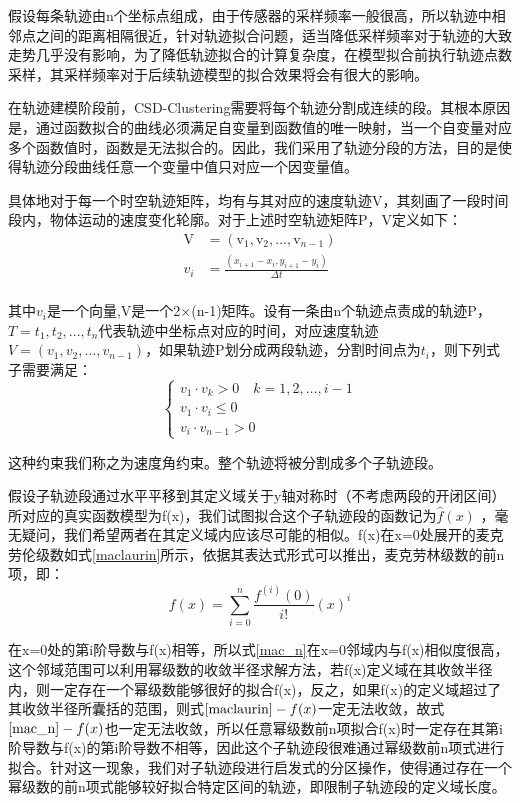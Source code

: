 假设每条轨迹由n个坐标点组成，由于传感器的采样频率一般很高，所以轨迹中相邻点之间的距离相隔很近，针对轨迹拟合问题，适当降低采样频率对于轨迹的大致走势几乎没有影响，为了降低轨迹拟合的计算复杂度，在模型拟合前执行轨迹点数采样，其采样频率对于后续轨迹模型的拟合效果将会有很大的影响。

在轨迹建模阶段前，CSD-Clustering需要将每个轨迹分割成连续的段。其根本原因是，通过函数拟合的曲线必须满足自变量到函数值的唯一映射，当一个自变量对应多个函数值时，函数是无法拟合的。因此，我们采用了轨迹分段的方法，目的是使得轨迹分段曲线任意一个变量中值只对应一个因变量值。

具体地对于每一个时空轨迹矩阵，均有与其对应的速度轨迹V，其刻画了一段时间段内，物体运动的速度变化轮廓。对于上述时空轨迹矩阵P，V定义如下：
\[\begin{aligned}
	\text{V}&=\left( \text{v}_1,\text{v}_2,...,\text{v}_{n-1} \right)\\
	v_i&=\frac{\left( x_{i+1}-x_i,y_{i+1}-y_i \right)}{\varDelta t}\\
\end{aligned}\]

其中$v_i$是一个向量,V是一个2×(n-1)矩阵。设有一条由n个轨迹点责成的轨迹P，$T={t_1,t_2,...,t_n}$代表轨迹中坐标点对应的时间，对应速度轨迹$V=(v_1,v_2,...,v_{n-1})$，如果轨迹P划分成两段轨迹，分割时间点为$t_i$，则下列式子需要满足：
\[
\left\{\begin{array}{c}
{v_{1} \cdot v_{k}>0 \quad k=1,2, \ldots, i-1} \\
{v_{1} \cdot v_{i} \leq 0} \\
{v_{i} \cdot v_{n-1}>0}
\end{array}\right.
\]

这种约束我们称之为速度角约束。整个轨迹将被分割成多个子轨迹段。

假设子轨迹段通过水平平移到其定义域关于y轴对称时（不考虑两段的开闭区间）所对应的真实函数模型为f(x)，我们试图拟合这个子轨迹段的函数记为$\hat{f}\left( x \right)$ ，毫无疑问，我们希望两者在其定义域内应该尽可能的相似。f(x)在x=0处展开的麦克劳伦级数如式\ref{maclaurin}所示，依据其表达式形式可以推出，麦克劳林级数的前n项，即：
\begin{equation}
\label{mac_n}
f\left( x \right) =\sum_{i=0}^n{\frac{f^{\left( i \right)}\left( 0 \right)}{i!}}\left( x \right) ^i
\end{equation}

在x=0处的第i阶导数与f(x)相等，所以式\ref{mac_n}在x=0邻域内与f(x)相似度很高，这个邻域范围可以利用幂级数的收敛半径求解方法，若f(x)定义域在其收敛半径内，则一定存在一个幂级数能够很好的拟合f(x)，反之，如果f(x)的定义域超过了其收敛半径所囊括的范围，则式$\ref{maclaurin}-f(x)$一定无法收敛，故式$\ref{mac_n}-f(x)$也一定无法收敛，所以任意幂级数前n项拟合f(x)时一定存在其第i阶导数与f(x)的第i阶导数不相等，因此这个子轨迹段很难通过幂级数前n项式进行拟合。针对这一现象，我们对子轨迹段进行启发式的分区操作，使得通过存在一个幂级数的前n项式能够较好拟合特定区间的轨迹，即限制子轨迹段的定义域长度。

